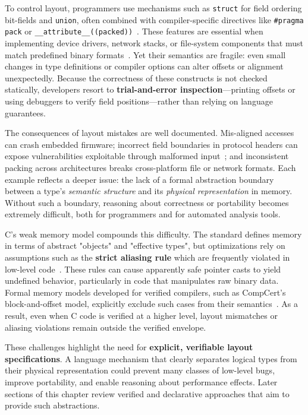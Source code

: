 To control layout, programmers use mechanisms such as \texttt{struct} for field 
ordering bit-fields and \texttt{union}, often combined with compiler-specific
directives like \texttt{\#pragma pack} or
\texttt{\_\_attribute\_\_((packed))}~\autocite{C_structures}. These features
are essential when implementing device drivers, network stacks, or
file-system components that must match predefined binary
formats~\autocite{network_memory_layouts,device_drivers}. Yet their semantics
are fragile: even small changes in type definitions or compiler options
can alter offsets or alignment unexpectedly. Because the correctness of these
constructs is not checked statically, developers resort to
\textbf{trial-and-error inspection}—printing offsets or using debuggers to
verify field positions—rather than relying on language guarantees.

The consequences of layout mistakes are well documented. Mis-aligned accesses
can crash embedded firmware; incorrect field boundaries in protocol headers
can expose vulnerabilities exploitable through malformed
input~\autocite{memory_errors_stridharan,memory_errors_stridharan}; and
inconsistent packing across architectures breaks cross-platform file or
network formats. Each example reflects a deeper issue: the lack of a formal
abstraction boundary between a type's \textit{semantic structure} and its
\textit{physical representation} in  memory. Without such a
boundary, reasoning about correctness or
portability becomes extremely difficult, both for programmers
and for automated analysis tools.

C's weak memory model compounds this difficulty. The standard defines
memory in terms of abstract "objects" and "effective types", but
optimizations rely on assumptions such as the \textbf{strict aliasing rule}
which are frequently violated in low-level
code~\autocite{strict_aliasing,whatyouc}. These rules can cause
apparently safe pointer casts to yield undefined behavior, particularly in code that
manipulates raw binary data. Formal memory models developed for verified
compilers, such as CompCert's block-and-offset model, explicitly
exclude such cases from their semantics~\autocite{leroy2012compcert}.
As a result, even when C code is verified at a higher level, layout
mismatches or aliasing violations remain outside the verified envelope.

These challenges highlight the need for \textbf{explicit, verifiable layout
specifications}. A language mechanism that clearly separates logical types
from their physical representation could prevent many classes of low-level
bugs, improve portability, and enable reasoning about performance effects.
Later sections of this chapter review verified and declarative approaches that
aim to provide such abstractions. 

